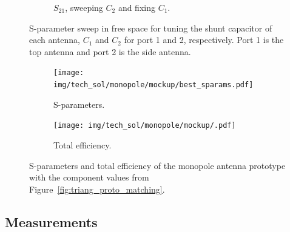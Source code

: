 \begin{figure}[htbp]
\begin{subfigure}[b]{0.49\linewidth}
        \caption{$S_{21}$, sweeping $C_2$ and fixing $C_1$.}
        \label{fig:ant1_proto_sim_s22}
    \end{subfigure}
    \caption{S-parameter sweep in free space for tuning the shunt capacitor of each antenna, $C_1$ and $C_2$ for port 1 and 2, respectively. Port 1 is the top antenna and port 2 is the side antenna.}
    \label{fig:sparam_mono_proto_sim}
\end{figure}

\begin{figure}[htbp]
    \centering
    \begin{subfigure}{0.49\linewidth}
        \texttt{[image: img/tech\_sol/monopole/mockup/best\_sparams.pdf]}
        \caption{S-parameters.}
    \end{subfigure}
    \hfill
    \begin{subfigure}{0.49\linewidth}
        \texttt{[image: img/tech\_sol/monopole/mockup/.pdf]}
        \caption{Total efficiency.}
    \end{subfigure}
    \caption{S-parameters and total efficiency of the monopole  antenna prototype with the component values from Figure~\ref{fig:triang_proto_matching}.}
    \label{fig:triang_proto_sparam_eff}
\end{figure}



\FloatBarrier
\subsection{Measurements}

